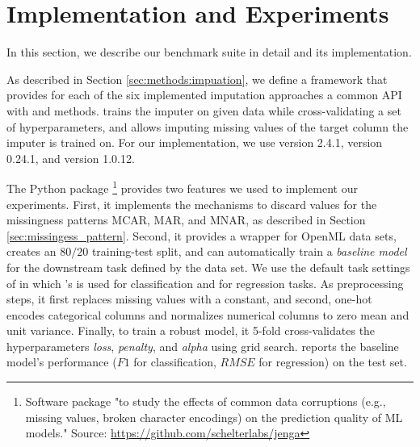 \section{Implementation and Experiments}
\label{sec:implementation}
%
In this section, we describe our benchmark suite in detail and its implementation.

As described in Section \ref{sec:methods:impuation}, we define a framework that provides for each of the six implemented imputation approaches a common API with  and  methods.  trains the imputer on given data while cross-validating a set of hyperparameters, and  allows imputing missing values of the target column the imputer is trained on. For our implementation, we use  version 2.4.1,  version 0.24.1, and  version 1.0.12.

The Python package \footnote{Software package "to study the effects of common data corruptions (e.g., missing values, broken character encodings) on the prediction quality of ML models." Source: \url{https://github.com/schelterlabs/jenga}} \citep{Jenga} provides two features we used to implement our experiments. First, it implements the mechanisms to discard values for the missingness patterns MCAR, MAR, and MNAR, as described in Section \ref{sec:missingess_pattern}. Second, it provides a wrapper for OpenML data sets, creates an $80/20$ training-test split, and can automatically train a \emph{baseline model} for the downstream task defined by the data set. We use the default task settings of  in which 's   is used for classification and  for regression tasks. As preprocessing steps, it first replaces missing values with a constant, and second, one-hot encodes categorical columns and normalizes numerical columns to zero mean and unit variance. Finally, to train a robust model, it 5-fold cross-validates the hyperparameters \emph{loss}, \emph{penalty}, and \emph{alpha} using grid search.  reports the baseline model's performance ($F1$ for classification, $RMSE$ for regression) on the test set.



